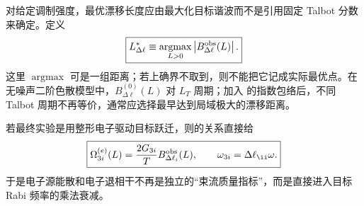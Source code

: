 对给定调制强度，最优漂移长度应由最大化目标谐波而不是引用固定 Talbot 分数来确定。定义
\begin{equation}
\boxed{
 L_{\Delta\ell}^*\equiv\underset{L>0}{\operatorname{argmax}}
 \left|B_{\Delta\ell}^{\rm obs}(L)\right| .}
\label{eq:optimal_bunching_length_dp47}
\end{equation}
这里 $\operatorname{argmax}$ 可是一组距离；若上确界不取到，则不能把它记成实际最优点。在无噪声二阶色散模型中，$B_{\Delta\ell}^{(0)}(L)$ 对 $L_T$ 周期；加入 的指数包络后，不同 Talbot 周期不再等价，通常应选择最早达到局域极大的漂移距离。

若最终实验是用整形电子驱动目标跃迁，则的关系直接给
\begin{equation}
\boxed{
 \Omega_{3i}^{(e)}(L)
 =\frac{2G_{3i}}{T}B_{\Delta\ell_i}^{\rm obs}(L),
 \qquad
 \omega_{3i}=\Delta\ell_\ii\omega .}
\label{eq:target_rabi_with_decoherence_dp47}
\end{equation}
于是电子源能散和电子退相干不再是独立的“束流质量指标”，而是直接进入目标 Rabi 频率的乘法衰减。


